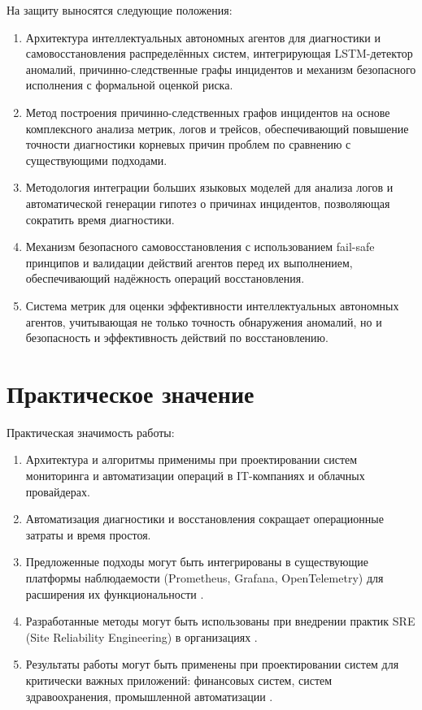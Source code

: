 На защиту выносятся следующие положения:

\begin{enumerate}
    \item Архитектура интеллектуальных автономных агентов для диагностики и самовосстановления распределённых систем, интегрирующая LSTM-детектор аномалий, причинно-следственные графы инцидентов и механизм безопасного исполнения с формальной оценкой риска.
    \item Метод построения причинно-следственных графов инцидентов на основе комплексного анализа метрик, логов и трейсов, обеспечивающий повышение точности диагностики корневых причин проблем по сравнению с существующими подходами.
    \item Методология интеграции больших языковых моделей для анализа логов и автоматической генерации гипотез о причинах инцидентов, позволяющая сократить время диагностики.
    \item Механизм безопасного самовосстановления с использованием fail-safe принципов и валидации действий агентов перед их выполнением, обеспечивающий надёжность операций восстановления.
    \item Система метрик для оценки эффективности интеллектуальных автономных агентов, учитывающая не только точность обнаружения аномалий, но и безопасность и эффективность действий по восстановлению.
\end{enumerate}

\section*{Практическое значение}

Практическая значимость работы:

\begin{enumerate}
    \item Архитектура и алгоритмы применимы при проектировании систем мониторинга и автоматизации операций в IT-компаниях и облачных провайдерах.
    \item Автоматизация диагностики и восстановления сокращает операционные затраты и время простоя.
    \item Предложенные подходы могут быть интегрированы в существующие платформы наблюдаемости (Prometheus, Grafana, OpenTelemetry) для расширения их функциональности \cite{prometheus_docs,grafana_docs,opentelemetry_docs}.
    \item Разработанные методы могут быть использованы при внедрении практик SRE (Site Reliability Engineering) в организациях \cite{google_sre_book,sre_principles}.
    \item Результаты работы могут быть применены при проектировании систем для критически важных приложений: финансовых систем, систем здравоохранения, промышленной автоматизации \cite{iso_25010,amazon_outage_cost}.
\end{enumerate}

